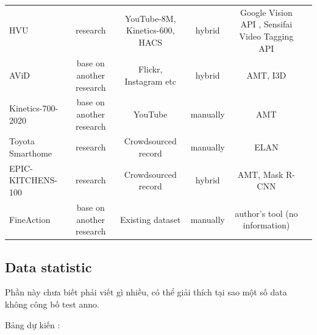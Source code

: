 \documentclass[a4paper]{article}
\begin{document}
\begin{table}
\begin{tabular}{l|c|c|c|c|c}
		HVU                     & research                 & YouTube-8M, Kinetics-600, HACS  & hybrid        & Google Vision API , Sensifai Video Tagging API \\
		AViD                    & base on another research & Flickr, Instagram etc           & hybrid        & AMT, I3D   \\
		Kinetics-700-2020       & base on another research & YouTube                         & manually      & AMT  \\
		Toyota Smarthome        & research                 & Crowdsourced record             & manually      & ELAN  \\
		EPIC-KITCHENS-100       & research                 & Crowdsourced record             & hybrid        & AMT, Mask R-CNN  \\	
		FineAction              & base on another research & Existing dataset                & manually      & author's tool (no information) \\
		\bottomrule
		
	\end{tabular}%
	\label{DataCollectionMethod}
\end{table}%

\subsection{Data statistic}

Phần này chưa biết phải viết gì nhiều, có thể giải thích tại sao một số data không công bố test anno.

Bảng dự kiến : 
\end{document}
